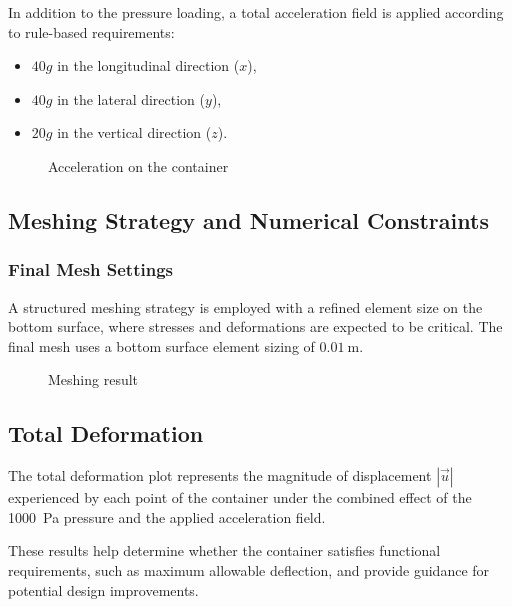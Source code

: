 \documentclass[11pt,a4paper]{article}
\begin{document}
	In addition to the pressure loading, a total acceleration field is applied according to rule-based requirements:
	\begin{itemize}
		\item \(40g\) in the longitudinal direction (\(x\)),
		\item \(40g\) in the lateral direction (\(y\)),
		\item \(20g\) in the vertical direction (\(z\)).\\
	\end{itemize} 
	
	
	\begin{figure}[H]
		\centering
		\caption{Acceleration on the container }
		\label{fig: Acceleration}
	\end{figure}
	
	\subsection{Meshing Strategy and Numerical Constraints}
	
		\subsubsection{Final Mesh Settings}
		
		A structured meshing strategy is employed with a refined element size on the bottom surface, where stresses and deformations are expected to be critical.
		The final mesh uses a bottom surface element sizing of \(0.01~\text{m}\).
		
		\begin{figure}[H]
			\centering
			\caption{Meshing result }
			\label{fig: meshing result }
		\end{figure}
		
		
	
	
	\subsection{Total Deformation}
	
	The total deformation plot represents the magnitude of displacement \(|\vec{u}|\) experienced by each point of the container under the combined effect of the 1000~Pa pressure and the applied acceleration field. 
	
	
	These results help determine whether the container satisfies functional requirements, such as maximum allowable deflection, and provide guidance for potential design improvements.
	
\end{document}

